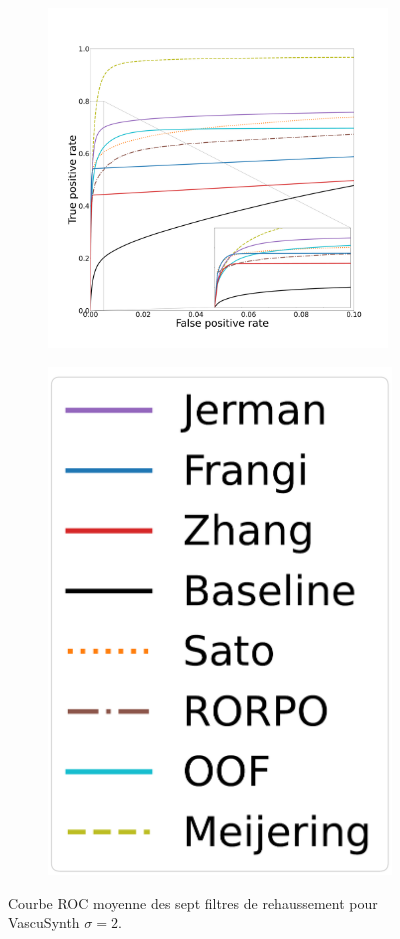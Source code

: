 \begin{figure}[!ht]
  \begin{subfigure}[t]{0.78\textwidth}
    \centering
  \includegraphics[clip = true, trim  =  125 125 100 200, height=9cm]{Images/Vascu_2_ROC.pdf}
\end{subfigure}
\begin{subfigure}[t]{0.2\textwidth}
  \includegraphics[width=\textwidth,clip = true]{Images/standAloneLegend.pdf}
\end{subfigure}
\caption{Courbe ROC moyenne des sept filtres de rehaussement pour VascuSynth $\sigma=2$.}
\end{figure}

